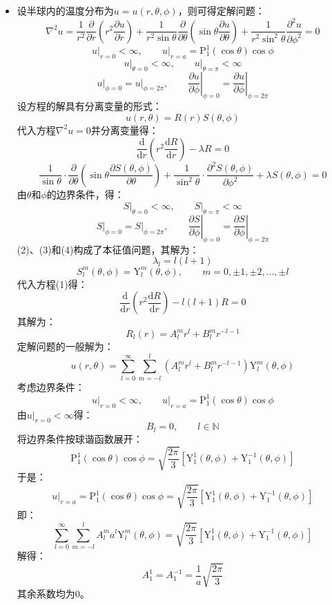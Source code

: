 \documentclass[fontset=windows]{ctexart}
\begin{document}
\begin{itemize}
    \item[11.(1)]
    设半球内的温度分布为$u = u(r,\theta,\phi)$，则可得定解问题：
    \[
    \nabla^2 u = \frac{1}{r^2}\frac{\partial}{\partial r}\left(r^2\frac{\partial u}{\partial r}\right) + \frac{1}{r^2\sin\theta}\frac{\partial}{\partial\theta}\left(\sin\theta\frac{\partial u}{\partial\theta}\right) + \frac{1}{r^2\sin^2\theta}\frac{\partial^2 u}{\partial\phi^2} = 0
    \]
    \[
    \left.u\right|_{r=0} < \infty,\qquad \left.u\right|_{r=a} = \mathrm{P}_1^1(\cos\theta)\cos\phi
    \]
    \[
    \left.u\right|_{\theta=0} < \infty,\qquad \left.u\right|_{\theta=\pi} < \infty
    \]
    \[
    \left.u\right|_{\phi=0} = \left.u\right|_{\phi=2\pi},\qquad \left.\frac{\partial u}{\partial\phi}\right|_{\phi=0} = \left.\frac{\partial u}{\partial\phi}\right|_{\phi=2\pi}
    \]
    设方程的解具有分离变量的形式：
    \[
    u(r,\theta) = R(r)S(\theta,\phi)
    \]
    代入方程$\nabla^2 u=0$并分离变量得：
    \[
    \frac{\mathrm{d}}{\mathrm{d}r}\left(r^2\frac{\mathrm{d}R}{\mathrm{d}r}\right) - \lambda R = 0 \tag{1}
    \]
    \[
    \frac{1}{\sin\theta}\cdot\frac{\partial}{\partial\theta}\left(\sin\theta\frac{\partial S(\theta,\phi)}{\partial\theta}\right) + \frac{1}{\sin^2\theta}\cdot\frac{\partial^2 S(\theta,\phi)}{\partial\phi^2} + \lambda S(\theta,\phi) = 0 \tag{2}
    \]
    由$\theta$和$\phi$的边界条件，得：
    \[
    \left.S\right|_{\theta=0} < \infty,\qquad \left.S\right|_{\theta=\pi} < \infty \tag{3}
    \]
    \[
    \left.S\right|_{\phi=0} = \left.S\right|_{\phi=2\pi},\qquad \left.\frac{\partial S}{\partial\phi}\right|_{\phi=0} = \left.\frac{\partial S}{\partial\phi}\right|_{\phi=2\pi} \tag{4}
    \]
    (2)、(3)和(4)构成了本征值问题，其解为：
    \[
    \lambda_l = l(l+1)
    \]
    \[
    S_l^m(\theta,\phi) = \mathrm{Y}_l^m(\theta,\phi),\qquad m = 0,\pm1,\pm2,...,\pm l
    \]
    代入方程(1)得：
    \[
    \frac{\mathrm{d}}{\mathrm{d}r}\left(r^2\frac{\mathrm{d}R}{\mathrm{d}r}\right) - l(l+1)R = 0 \tag{5}
    \]
    其解为：
    \[
    R_l(r) = A_l^m r^l + B_l^m r^{-l-1}
    \]
    定解问题的一般解为：
    \[
    u(r,\theta) = \sum_{l=0}^{\infty}\sum_{m=-l}^{l}\left(A_l^m r^l + B_l^m r^{-l-1}\right)\mathrm{Y}_l^m(\theta,\phi)
    \]
    考虑边界条件：
    \[
    \left.u\right|_{r=0} < \infty,\qquad \left.u\right|_{r=a} = \mathrm{P}_1^1(\cos\theta)\cos\phi
    \]
    由$\left.u\right|_{r=0} < \infty$得：
    \[
    B_l = 0,\qquad l\in\mathbb{N}
    \]
    将边界条件按球谐函数展开：
    \[
    \mathrm{P}_1^1(\cos\theta)\cos\phi = \sqrt{\frac{2\pi}{3}}\left[\mathrm{Y}_1^1(\theta,\phi) + \mathrm{Y}_1^{-1}(\theta,\phi)\right]
    \]
    于是：
    \[
    \left.u\right|_{r=a} = \mathrm{P}_1^1(\cos\theta)\cos\phi = \sqrt{\frac{2\pi}{3}}\left[\mathrm{Y}_1^1(\theta,\phi) + \mathrm{Y}_1^{-1}(\theta,\phi)\right]
    \]
    即：
    \[
    \sum_{l=0}^{\infty}\sum_{m=-l}^{l}A_l^m a^l \mathrm{Y}_l^m(\theta,\phi) = \sqrt{\frac{2\pi}{3}}\left[\mathrm{Y}_1^1(\theta,\phi) + \mathrm{Y}_1^{-1}(\theta,\phi)\right]
    \]
    解得：
    \[
    A_1^1 = A_1^{-1} = \frac{1}{a}\sqrt{\frac{2\pi}{3}}
    \]
    其余系数均为0。


\end{itemize}
\end{document}
